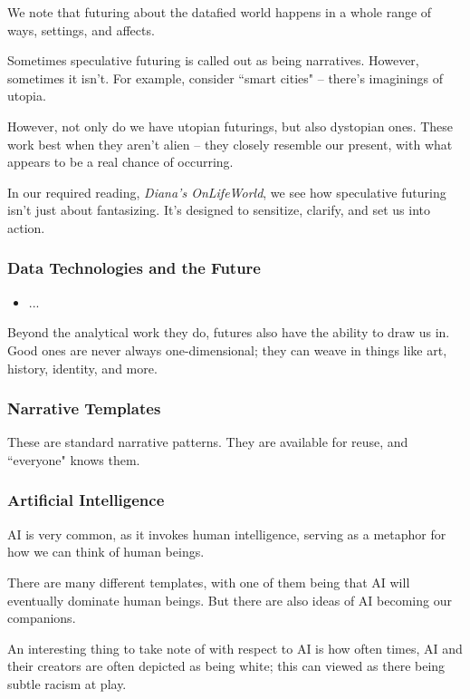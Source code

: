 \documentclass[openany]{book}
\begin{document}
We note that futuring about the datafied world happens in a whole range of ways, settings, and affects.

Sometimes speculative futuring is called out as being narratives. However, sometimes it isn't. For example, consider ``smart cities" -- there's imaginings of utopia.

However, not only do we have utopian futurings, but also dystopian ones. These work best when they aren't alien -- they closely resemble our present, with what appears to be a real chance of occurring.

In our required reading, \textit{Diana's OnLifeWorld}, we see how speculative futuring isn't just about fantasizing. It's designed to sensitize, clarify, and set us into action.

\subsubsection{Data Technologies and the Future}
\begin{itemize}
	\item ...
\end{itemize}

Beyond the analytical work they do, futures also have the ability to draw us in. Good ones are never always one-dimensional; they can weave in things like art, history, identity, and more.

\subsubsection{Narrative Templates}
These are standard narrative patterns. They are available for reuse, and ``everyone" knows them.


\subsubsection{Artificial Intelligence}
AI is very common, as it invokes human intelligence, serving as a metaphor for how we can think of human beings.

There are many different templates, with one of them being that AI will eventually dominate human beings. But there are also ideas of AI becoming our companions.

An interesting thing to take note of with respect to AI is how often times, AI and their creators are often depicted as being white; this can viewed as there being subtle racism at play.
\end{document}
